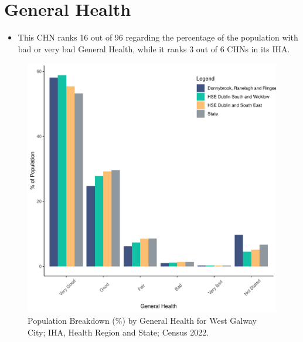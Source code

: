 \documentclass{article}
\begin{document}
\pagebreak

\section{General Health}\label{sect:GenHealth}
\begin{itemize}
\item  This CHN ranks  16 out of 96 regarding the percentage of the population with bad or very bad General Health, while it ranks   3 out of 6 CHNs in its IHA.
\end{itemize}
\begin{figure}[h]
	\centering
	\includegraphics[width = 150mm]{../figures/GenED.pdf}
	\caption{Population Breakdown (\%) by General Health for West Galway City; IHA, Health Region and State;  Census 2022.}
	\label{fig:2ae19629-1a6a-13a3-e055-000000000001}
	\end{figure}
\end{document}
